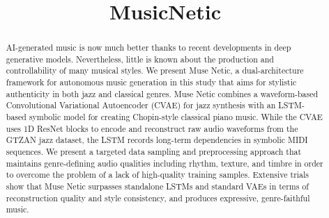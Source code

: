 \documentclass[conference]{IEEEtran}
\begin{document}
\title{MusicNetic\\}

\author{
\and
{}
\and
{}
\and
{}
\and
{}
\and
{}
}

\maketitle


\begin{abstract}
AI-generated music is now much better thanks to recent developments in deep generative models. Nevertheless, little is known about the production and controllability of many musical styles. We present Muse Netic, a dual-architecture framework for autonomous music generation in this study that aims for stylistic authenticity in both jazz and classical genres. Muse Netic combines a waveform-based Convolutional Variational Autoencoder (CVAE) for jazz synthesis with an LSTM-based symbolic model for creating Chopin-style classical piano music. While the CVAE uses 1D ResNet blocks to encode and reconstruct raw audio waveforms from the GTZAN jazz dataset, the LSTM records long-term dependencies in symbolic MIDI sequences. We present a targeted data sampling and preprocessing approach that maintains genre-defining audio qualities including rhythm, texture, and timbre in order to overcome the problem of a lack of high-quality training samples. Extensive trials show that Muse Netic surpasses standalone LSTMs and standard VAEs in terms of reconstruction quality and style consistency, and produces expressive, genre-faithful music.
\end{abstract}
\end{document}
